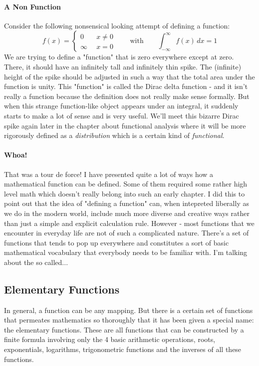 \paragraph{A Non Function}
Consider the following nonsensical looking attempt of defining a function:
\begin{equation}
f(x) = 
\begin{cases} 
0       \quad& x \neq 0 \\
\infty       & x = 0
\end{cases} \qquad \text{with} \qquad
\int_{-\infty}^{\infty} f(x) \, dx = 1
\end{equation}
We are trying to define a "function" that is zero everywhere except at zero. There, it should have an infinitely tall and infinitely thin spike. The (infinite) height of the spike should be adjusted in such a way that the total area under the function is unity. This "function" is called the Dirac delta function - and it isn't really a function because the definition does not really make sense formally. But when this strange function-like object appears under an integral, it suddenly starts to make a lot of sense and is very useful. We'll meet this bizarre Dirac spike again later in the chapter about functional analysis where it will be more rigorously defined as a \emph{distribution} which is a certain kind of \emph{functional}.



\paragraph{Whoa!} That was a tour de force! I have presented quite a lot of ways how a mathematical function can be defined. Some of them required some rather high level math which doesn't really belong into such an early chapter. I did this to point out that the idea of "defining a function" can, when intepreted liberally as we do in the modern world, include much more diverse and creative ways rather than just a simple and explicit calculation rule. However - most functions that we encounter in everyday life are not of such a complicated nature. There's a set of functions that tends to pop up everywhere and constitutes a sort of basic mathematical vocabulary that everybody needs to be familiar with. I'm talking about the so called...

\subsection{Elementary Functions}
In general, a function can be any mapping. But there is a certain set of functions that permeates mathematics so thoroughly that it has been given a special name: the elementary functions. These are all functions that can be constructed by a finite formula involving only the 4 basic arithmetic operations, roots, exponentials, logarithms, trigonometric functions and the inverses of all these functions.

